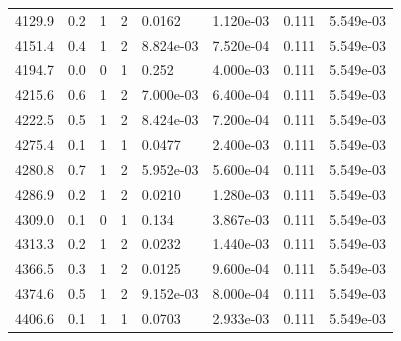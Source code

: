 \documentclass[preview]{standalone}
\begin{document}
{{{{{{{\begin{tabular}{L{1.2cm}C{1.2cm} C{0.3cm}C{0.5cm} C{1.4cm}C{1.4cm} C{1.4cm}C{1.4cm}}
  4129.9  &   0.2  & 1     &  2 &  0.0162  & 1.120e-03  & 0.111 &  5.549e-03   \\ 
  4151.4  &   0.4  & 1     &  2 &  8.824e-03  & 7.520e-04  & 0.111 &  5.549e-03   \\ 
  4194.7  &   0.0  & 0     &  1 &  0.252  & 4.000e-03  & 0.111 &  5.549e-03   \\ 
  4215.6  &   0.6  & 1     &  2 &  7.000e-03  & 6.400e-04  & 0.111 &  5.549e-03   \\ 
  4222.5  &   0.5  & 1     &  2 &  8.424e-03  & 7.200e-04  & 0.111 &  5.549e-03   \\ 
  4275.4  &   0.1  & 1     &  1 &  0.0477  & 2.400e-03  & 0.111 &  5.549e-03   \\ 
  4280.8  &   0.7  & 1     &  2 &  5.952e-03  & 5.600e-04  & 0.111 &  5.549e-03   \\ 
  4286.9  &   0.2  & 1     &  2 &  0.0210  & 1.280e-03  & 0.111 &  5.549e-03   \\ 
  4309.0  &   0.1  & 0     &  1 &  0.134  & 3.867e-03  & 0.111 &  5.549e-03   \\ 
  4313.3  &   0.2  & 1     &  2 &  0.0232  & 1.440e-03  & 0.111 &  5.549e-03   \\ 
  4366.5  &   0.3  & 1     &  2 &  0.0125  & 9.600e-04  & 0.111 &  5.549e-03   \\ 
  4374.6  &   0.5  & 1     &  2 &  9.152e-03  & 8.000e-04  & 0.111 &  5.549e-03   \\ 
  4406.6  &   0.1  & 1     &  1 &  0.0703  & 2.933e-03  & 0.111 &  5.549e-03   \\ 
\hline 
\end{tabular} 

}}}}}}}
\end{document}
